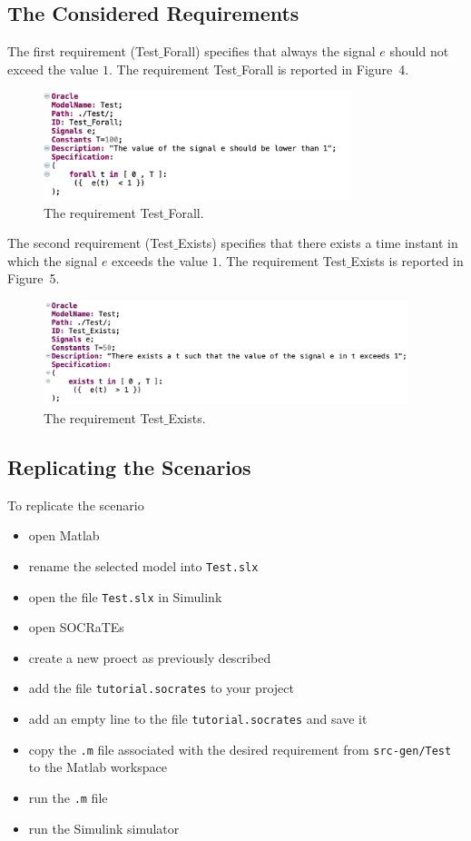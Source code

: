\documentclass[12pt]{extarticle}
\newcommand{\<}{\langle}
\renewcommand{\>}{\rangle}
\theoremstyle{definition}
\begin{document}
\subsection{The Considered Requirements}
The first requirement (Test$\_$Forall) specifies that always the signal $e$ should not exceed the value $1$.
The requirement  Test$\_$Forall is reported in Figure~4.

\begin{figure}[h]
\caption{The requirement Test$\_$Forall.}
  \centering
    \includegraphics[width=0.8\textwidth]{Manual/Req1.png}
\end{figure}

\noindent The second requirement (Test$\_$Exists) specifies that there exists a time instant in which the signal $e$  exceeds the value $1$.
The requirement  Test$\_$Exists is reported in Figure~5.

\begin{figure}[h]
\caption{The requirement  Test$\_$Exists.}
  \centering
    \includegraphics[width=0.95\textwidth]{Manual/Req2.png}
\end{figure}
\clearpage
\subsection{Replicating the Scenarios}
To replicate the scenario
\begin{itemize}
\item open Matlab
\item rename the selected model into \texttt{Test.slx}
\item open the file \texttt{Test.slx} in Simulink
\item open SOCRaTEs
\item create a new proect as previously described
\item add the file \texttt{tutorial.socrates} to your project
\item add an empty line to the file \texttt{tutorial.socrates} and save it
\item copy the \texttt{.m} file associated with the desired requirement from \texttt{src-gen/Test} to the Matlab workspace
\item run the \texttt{.m} file
\item run the Simulink simulator
\end{itemize}
\clearpage
\end{document}
